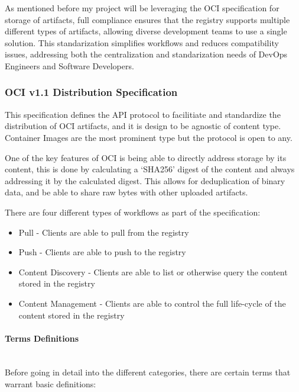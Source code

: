 \documentclass{article}
\newcommand{\subsubsubsection}[1]{\paragraph{#1}\mbox{}\\}
\begin{document}
  As mentioned before my project will be leveraging the OCI specification for storage of artifacts, full compliance ensures that the registry supports multiple different types of artifacts, allowing diverse development teams to use a single solution. This standarization simplifies workflows and reduces compatibility issues, addressing both the centralization and standarization needs of DevOps Engineers and Software Developers.

  \subsubsection{OCI v1.1 Distribution Specification}

  This specification defines the API protocol to facilitiate and standardize the distribution of OCI artifacts, and it is design to be agnostic of content type. Container Images are the most prominent type but the protocol is open to any.

  One of the key features of OCI is being able to directly address storage by its content, this is done by calculating a `SHA256' digest of the content and always addressing it by the calculated digest. This allows for deduplication of binary data, and be able to share raw bytes with other uploaded artifacts.

  There are four different types of workflows as part of the specification:

  \begin{itemize}
    \item Pull - Clients are able to pull from the registry
    \item Push - Clients are able to push to the registry
    \item Content Discovery - Clients are able to list or otherwise query the content stored in the registry
    \item Content Management - Clients are able to control the full life-cycle of the content stored in the registry
  \end{itemize}
  
  \subsubsubsection{Terms Definitions}

  Before going in detail into the different categories, there are certain terms that warrant basic definitions:
\end{document}

